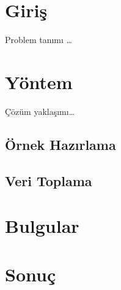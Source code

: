 \documentclass{article}
\begin{document}
\section{Giriş}

Problem tanımı \ldots

\section{Yöntem}

Çözüm yaklaşımı\ldots

\subsection{Örnek Hazırlama}

\subsection{Veri Toplama}

\section{Bulgular}

\section{Sonuç}
\end{document}
